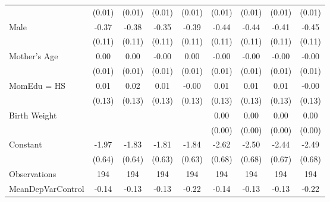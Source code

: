 {\begin{tabular}{l*{8}{c}}
                    &      (0.01)         &      (0.01)         &      (0.01)         &      (0.01)         &      (0.01)         &      (0.01)         &      (0.01)         &      (0.01)         \\
[1em]
Male                &       -0.37\sym{***}&       -0.38\sym{***}&       -0.35\sym{***}&       -0.39\sym{***}&       -0.44\sym{***}&       -0.44\sym{***}&       -0.41\sym{***}&       -0.45\sym{***}\\
                    &      (0.11)         &      (0.11)         &      (0.11)         &      (0.11)         &      (0.11)         &      (0.11)         &      (0.11)         &      (0.11)         \\
[1em]
Mother's Age        &        0.00         &        0.00         &       -0.00         &        0.00         &       -0.00         &       -0.00         &       -0.00         &       -0.00         \\
                    &      (0.01)         &      (0.01)         &      (0.01)         &      (0.01)         &      (0.01)         &      (0.01)         &      (0.01)         &      (0.01)         \\
[1em]
MomEdu = HS         &        0.01         &        0.02         &        0.01         &       -0.00         &        0.01         &        0.01         &        0.01         &       -0.00         \\
                    &      (0.13)         &      (0.13)         &      (0.13)         &      (0.13)         &      (0.13)         &      (0.13)         &      (0.13)         &      (0.13)         \\
[1em]
Birth Weight        &                     &                     &                     &                     &        0.00\sym{**} &        0.00\sym{**} &        0.00\sym{**} &        0.00\sym{**} \\
                    &                     &                     &                     &                     &      (0.00)         &      (0.00)         &      (0.00)         &      (0.00)         \\
[1em]
Constant            &       -1.97\sym{***}&       -1.83\sym{***}&       -1.81\sym{***}&       -1.84\sym{***}&       -2.62\sym{***}&       -2.50\sym{***}&       -2.44\sym{***}&       -2.49\sym{***}\\
                    &      (0.64)         &      (0.64)         &      (0.63)         &      (0.63)         &      (0.68)         &      (0.68)         &      (0.67)         &      (0.68)         \\
\hline
Observations        &         194         &         194         &         194         &         194         &         194         &         194         &         194         &         194         \\
MeanDepVarControl   &       -0.14         &       -0.13         &       -0.13         &       -0.22         &       -0.14         &       -0.13         &       -0.13         &       -0.22         \\
\hline\hline
\end{tabular}
}
